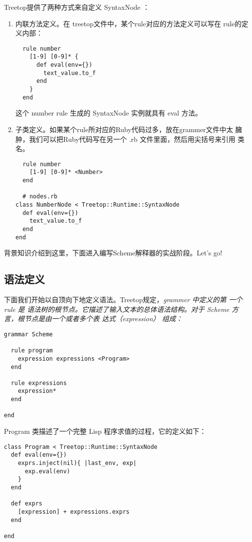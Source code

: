 \documentclass{article}
\begin{document}
Treetop提供了两种方式来自定义 SyntaxNode ：
\begin{enumerate}
\item 内联方法定义。在 treetop文件中，某个rule对应的方法定义可以写在
  rule的定义内部：
\begin{lstlisting}
  rule number
    [1-9] [0-9]* {
      def eval(env={})
        text_value.to_f
      end
    }
  end
\end{lstlisting}
这个 number rule 生成的 SyntaxNode 实例就具有 eval 方法。
\item 子类定义。如果某个rule所对应的Ruby代码过多，放在grammer文件中太
  臃肿，我们可以把Ruby代码写在另一个 .rb 文件里面，然后用尖括号来引用
  类名。
\begin{lstlisting}
  rule number
    [1-9] [0-9]* <Number>
  end

  # nodes.rb
class NumberNode < Treetop::Runtime::SyntaxNode
  def eval(env={})
    text_value.to_f
  end
end
\end{lstlisting}

\end{enumerate}
背景知识介绍到这里，下面进入编写Scheme解释器的实战阶段。Let's go!

\subsection{语法定义}
下面我们开始以自顶向下地定义语法。Treetop规定，\em{grammer} 中定义的第
一个 \em{rule} 是 语法树的根节点。它描述了输入文本的总体语法结构。对于 Scheme 方言，根节点是由一个或者多个表
达式（expression） 组成：
\begin{verbatim}
grammar Scheme

  rule program
    expression expressions <Program>
  end

  rule expressions
    expression*
  end

end
\end{verbatim}

Program 类描述了一个完整 Lisp 程序求值的过程，它的定义如下：
\begin{verbatim}
class Program < Treetop::Runtime::SyntaxNode
  def eval(env={})
    exprs.inject(nil){ |last_env, exp|
      exp.eval(env)
    }
  end

  def exprs
    [expression] + expressions.exprs
  end

end
\end{verbatim}
\end{document}
